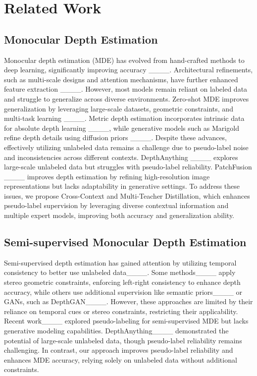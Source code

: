 \section{Related Work}
\label{sec:Related}
\subsection{Monocular Depth Estimation}
Monocular depth estimation (MDE) has evolved from hand-crafted methods to deep learning, significantly improving accuracy ____. Architectural refinements, such as multi-scale designs and attention mechanisms, have further enhanced feature extraction ____. However, most models remain reliant on labeled data and struggle to generalize across diverse environments.
Zero-shot MDE improves generalization by leveraging large-scale datasets, geometric constraints, and multi-task learning ____. Metric depth estimation incorporates intrinsic data for absolute depth learning ____, while generative models such as Marigold refine depth details using diffusion priors ____. 
Despite these advances, effectively utilizing unlabeled data remains a challenge due to pseudo-label noise and inconsistencies across different contexts. DepthAnything ____ explores large-scale unlabeled data but struggles with pseudo-label reliability. PatchFusion ____ improves depth estimation by refining high-resolution image representations but lacks adaptability in generative settings.
To address these issues, we propose Cross-Context and Multi-Teacher Distillation, which enhances pseudo-label supervision by leveraging diverse contextual information and multiple expert models, improving both accuracy and generalization ability.

\subsection{Semi-supervised Monocular Depth Estimation}

Semi-supervised depth estimation has gained attention by utilizing temporal consistency to better use unlabeled data____. Some methods____ apply stereo geometric constraints, enforcing left-right consistency to enhance depth accuracy, while others use additional supervision like semantic priors____ or GANs, such as DepthGAN____. However, these approaches are limited by their reliance on temporal cues or stereo constraints, restricting their applicability. Recent work____ explored pseudo-labeling for semi-supervised MDE but lacks generative modeling capabilities. DepthAnything____ demonstrated the potential of large-scale unlabeled data, though pseudo-label reliability remains challenging. In contrast, our approach improves pseudo-label reliability and enhances MDE accuracy, relying solely on unlabeled data without additional constraints.

